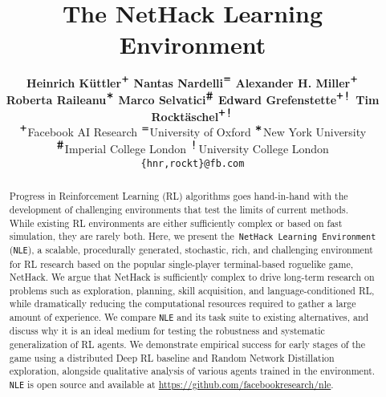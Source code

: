 \documentclass{article}
\title{The NetHack Learning Environment}
\author{\textbf{Heinrich K{\"u}ttler}$^{\texttt{\large +}}{}$
    \textbf{Nantas Nardelli}$^{\texttt{\large =}}{}$
    \textbf{Alexander H. Miller}$^{\texttt{\large +}}{}$\\
    \textbf{Roberta Raileanu}$^{\texttt{\large *}}{}$
    \textbf{Marco Selvatici}$^{\texttt{\large \#}}{}$
    \textbf{Edward Grefenstette}$^{\texttt{\large +}{} \texttt{\large !}{}}$
    \textbf{Tim Rockt{\"a}schel}$^{\texttt{\large +}{} \texttt{\large !}{}}$\\[1em]
    $^{\texttt{\large +}}{}$Facebook AI Research ${}^{\texttt{\large =}}{}$University of Oxford ${}^{\texttt{\large *}}{}$New York University\\
    ${}^{\texttt{\large \#}}{}$Imperial College London ${}^{\texttt{\large !}}{}$University College London\\[0.5em]
    \texttt{\{hnr,rockt\}@fb.com}
}
\newcommand{\nethack}{NetHack}
\newcommand{\nethackenv}{\texttt{NetHack Learning Environment}}
\newcommand{\NLE}{\texttt{NLE}}
\begin{document}
\maketitle

\begin{abstract}
Progress in Reinforcement Learning (RL) algorithms goes hand-in-hand
with the development of challenging environments that test the limits
of current methods. While existing RL environments are either
sufficiently complex or based on fast simulation, they are rarely
both. Here, we present the~\nethackenv{} (\NLE{}), a scalable,
procedurally generated, stochastic, rich, and challenging environment
for RL research based on the popular single-player terminal-based
roguelike game, \nethack{}. We argue that NetHack is sufficiently
complex to drive long-term research on problems such as exploration,
planning, skill acquisition, and language-conditioned RL, while
dramatically reducing the computational resources required to gather a
large amount of experience. We compare \NLE{} and its task suite to
existing alternatives, and discuss why it is an ideal medium for
testing the robustness and systematic generalization of RL agents. We
demonstrate empirical success for early stages of the game using a
distributed Deep RL baseline and Random Network Distillation
exploration, alongside qualitative analysis of various agents trained
in the environment.
\NLE{} is open source and available
at \url{https://github.com/facebookresearch/nle}.
\end{abstract}
\end{document}
